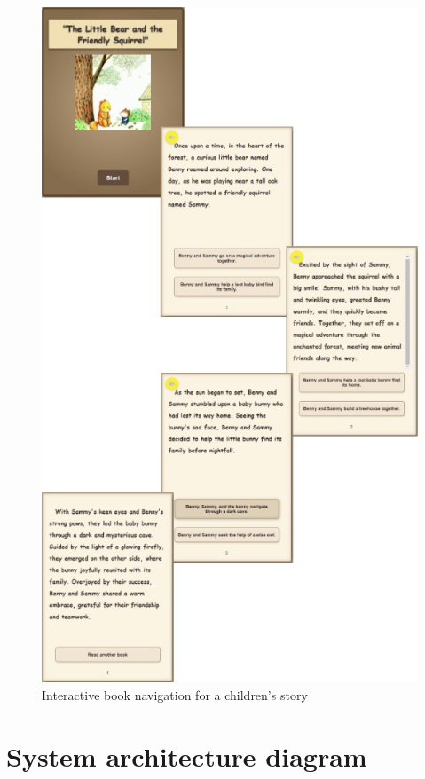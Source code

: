 \documentclass[conference]{IEEEtran}
\begin{document}
	\begin{figure}[H]
		\centering
		\includegraphics[width=0.7\linewidth]{img/img-ari3333-project-report-story-children}
		\caption{Interactive book navigation for a children's story}
		\label{fig:img-ari3333-project-report-story-children}
	\end{figure}
	
	
\pagebreak	
\section{System architecture diagram}
\label{appendix:system-architecture}
\end{document}
